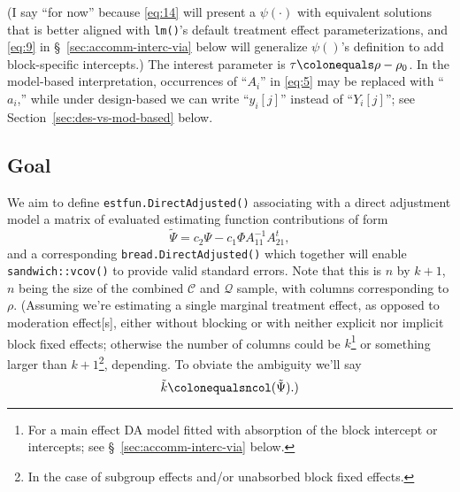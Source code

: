 \documentclass{article}
\newcommand{\defeq}{\ensuremath{\colonequals}}
\begin{document}
(I say ``for now'' because \eqref{eq:14} will present a
$\psi(\cdot)$ with equivalent solutions that is better aligned with
\texttt{lm()}'s default treatment effect parameterizations, and
\eqref{eq:9} in \S~\ref{sec:accomm-interc-via} below will generalize $\psi()$'s definition
to add block-specific intercepts.)
The interest parameter is $\tau \defeq \rho - \rho_{0}$. In the model-based interpretation, occurrences of ``$A_{i}$'' in \eqref{eq:5} may be replaced with ``$a_{i}$,'' while under design-based we can write ``$y_{i}[j]$'' instead of ``$Y_{i}[j]$''; see Section~\ref{sec:des-vs-mod-based} below.

\subsection{Goal} \label{sec:goal}
We aim to define \texttt{estfun.DirectAdjusted()} associating
with a direct adjustment model a matrix of evaluated estimating function
contributions of form
\begin{equation} \label{eq:22}
  \tilde{\Psi} = c_{2}\Psi - c_{1}\Phi A_{11}^{-1}A_{21}^{t},
\end{equation}
and a corresponding \texttt{bread.DirectAdjusted()} which together will enable \texttt{sandwich::vcov()} to provide valid standard errors. 
Note that this is $n$ by
$k+1$, $n$ being the size of the combined $\mathcal{C}$ and
$\mathcal{Q}$ sample, with columns corresponding to $\rho$.%
(Assuming we're estimating a single marginal treatment effect, as
opposed to moderation effect[s], either without blocking or with
neither explicit nor implicit block fixed effects; otherwise the
number of columns could be $k$\footnote{For a main effect
DA model fitted with absorption of the block intercept or
intercepts; see \S~\ref{sec:accomm-interc-via} below.} or something
larger than $k+1$\footnote{In the case of subgroup effects and/or unabsorbed block fixed effects.},
depending. To obviate the ambiguity we'll say
\begin{equation*}
  \tilde{k} \defeq \mathtt{ncol}(\tilde{\Psi}).)
\end{equation*}
\end{document}

